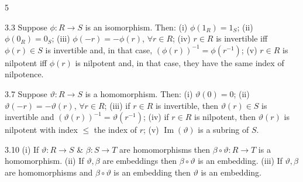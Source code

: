 \documentclass[8pt]{extarticle}
\begin{document}
\begin{multicols}{5}
{{
            }
        }
        \vspace{-1pt}

        \begin{lemma}{3.3}
            Suppose \(\phi:R\to S\) is an isomorphism. Then: (i) \(\phi(1_R)=1_S\); (ii) \(\phi(0_R)=0_S\); (iii) \(\phi(-r)=-\phi(r)\), \(\forall r\in R\); (iv) \(r\in R\) is invertible iff \(\phi(r)\in S\) is invertible and, in that case, \((\phi(r))^{-1}=\phi(r^{-1})\); (v) \(r\in R\) is nilpotent iff \(\phi(r)\) is nilpotent and, in that case, they have the same index of nilpotence.
        \end{lemma}

        \begin{lemma}{3.7}
            Suppose \(\vartheta:R\to S\) is a homomorphism. Then: (i) \(\vartheta(0)=0\); (ii) \(\vartheta(-r)=-\vartheta(r)\), \(\forall r\in R\); (iii) if \(r\in R\) is invertible, then \(\vartheta(r)\in S\) is invertible and \((\vartheta(r))^{-1}=\vartheta(r^{-1})\); (iv) if \(r\in R\) is nilpotent, then \(\vartheta(r)\) is nilpotent with index \(\le\) the index of \(r\); (v) \(\operatorname{Im}(\vartheta)\) is a subring of \(S\).
        \end{lemma}

        \begin{lemma}{3.10}
            (i) If \(\vartheta:R\to S\) \& \(\beta:S\to T\) are homomorphisms then \(\beta\circ\vartheta:R\to T\) is a homomorphism. (ii) If \(\vartheta,\beta\) are embeddings then \(\beta\circ\vartheta\) is an embedding. (iii) If \(\vartheta,\beta\) are homomorphisms and \(\beta\circ\vartheta\) is an embedding then \(\vartheta\) is an embedding.
        \end{lemma}


\end{multicols}
\end{document}
